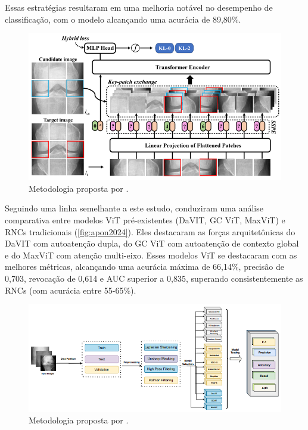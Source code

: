 Essas estratégias resultaram em uma melhoria notável no desempenho de classificação, com o modelo alcançando uma acurácia de 89,80\%.

\begin{figure}[ht]
    \centering
    \includegraphics[width=\textwidth]{figs/wang2024.png}
    \caption{Metodologia proposta por \cite{Wang_2024}.}
    \label{fig:wang2024}
\end{figure}

Seguindo uma linha semelhante a este estudo, \cite{apon2024} conduziram uma análise comparativa entre modelos ViT pré-existentes (DaVIT, GC ViT, MaxViT) e RNCs tradicionais (\autoref{fig:apon2024}). Eles destacaram as forças arquitetônicas do DaVIT com autoatenção dupla, do GC ViT com autoatenção de contexto global e do MaxViT com atenção multi-eixo. Esses modelos ViT se destacaram com as melhores métricas, alcançando uma acurácia máxima de 66,14\%, precisão de 0,703, revocação de 0,614 e AUC superior a 0,835, superando consistentemente as RNCs (com acurácia entre 55-65\%).

\begin{figure}[ht]
    \centering
    \includegraphics[width=\textwidth]{figs/apon2024.png}
    \caption{Metodologia proposta por \cite{apon2024}.}
    \label{fig:apon2024}
\end{figure}